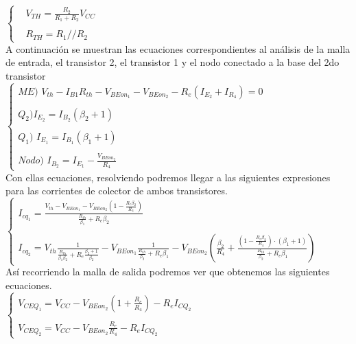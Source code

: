 		$
		\begin{cases}
		&V_{TH} = \frac{R_2}{R_1 + R_2} V_{CC}\\ \\
		&R_{TH} = R_1 // R_2 
		\end{cases}
		\label{Thevenin}
		$\\

A continuación se muestran las ecuaciones correspondientes al análisis de la malla de entrada, el transistor 2, el transistor 1 y el nodo conectado a la base del 2do transistor\\

		$
		\begin{cases}
		ME) \, \, V_{th}-I_{B1}R_{th}-V_{BEon_{1}}-V_{BEon_{2}}-R_{e}(I_{E_{2}}+I_{R_{4}})=0 \\  \\
		Q_{2}) I_{E_{2}}=I_{B_{2}}(\beta_{2}+1)\\ \\
		Q_{1}) \, \, I_{E_{1}} = I_{B_{1}}(\beta_{1}+1)\\ \\
		Nodo) \, \, I_{B_{2}} = I_{E_{1}} - \frac{V_{BEon_{2}}}{R_{4}}
		\end{cases}
		$\\

Con ellas ecuaciones, resolviendo podremos llegar a las siguientes expresiones para las corrientes de colector de ambos transistores.\\

		$
		\begin{cases}
		I_{cq_{1}}=\frac{V_{th}-V_{BEon_{1}}-V_{BEon_{2}}\left(1-\frac{R_{e}\beta_{2}}{R_{4}}\right)}{\frac{R_{th}}{\beta_{1}}+R_{e}\beta_{2}}\\ \\
		I_{cq_{2}}=V_{th}\frac{1}{\frac{R_{th}}{\beta_{1}\beta_{2}}+R_{e}\frac{\beta_{2}+1}{\beta_{2}}}-V_{BEon_{1}}\frac{1}{\frac{R_{th}}{\beta_{2}}+R_{e}\beta_{1}}-V_{BEon_{2}}\left(\frac{\beta_{2}}{R_{4}}+\frac{\left(1-\frac{R_{e}\beta_{2}}{R_{4}}\right)\cdot(\beta_{1}+1)}{\frac{R_{th}}{\beta_{2}}+R_{e}\beta_{1}} \right)
		\end{cases}
		$\\

Así recorriendo la malla de salida podremos ver que obtenemos las siguientes ecuaciones.\\

		$
		\begin{cases}
		V_{CEQ_{1}}=V_{CC}-V_{BEon_{2}}\left(1+\frac{R_{e}}{R_{4}}\right)-R_{e}I_{CQ_{2}}\\ \\
		V_{CEQ_{2}}=V_{CC}-V_{BEon_{2}}\frac{R_{e}}{R_{4}}-R_{e}I_{CQ_{2}}
		\end{cases}
		$\\
	

